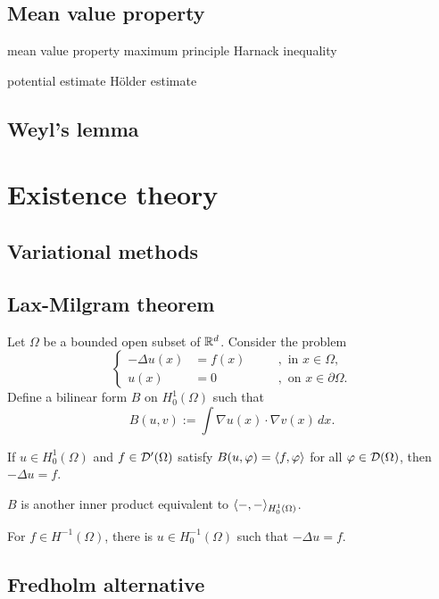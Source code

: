 \documentclass{../../large}
\begin{document}
\section{Mean value property}
mean value property
maximum principle
Harnack inequality

potential estimate
H\"older estimate


\section{Weyl's lemma}



\chapter{Existence theory}

\section{Variational methods}

\section{Lax-Milgram theorem}
\begin{prb}
Let $\Omega$ be a bounded open subset of $\mathbb{R}^d$.
Consider the problem
\[\left\{\begin{alignedat}{2}
-\Delta u(x)&=f(x)&\quad&,\text{ in }x\in\Omega,\\
u(x)&=0&&,\text{ on }x\in\partial\Omega.
\end{alignedat}\right.\]
Define a bilinear form $B$ on $H_0^1(\Omega)$ such that
\[B(u,v):=\int\nabla u(x)\cdot\nabla v(x)\,dx.\]
\begin{parts}
\item If $u\in H_0^1(\Omega)$ and $f\in\mathcal{D}'(\Omega)$ satisfy $B(u,\varphi)=\langle f,\varphi\rangle$ for all $\varphi\in\mathcal{D}(\Omega)$, then $-\Delta u=f$.
\item $B$ is another inner product equivalent to $\langle-,-\rangle_{H_0^1(\Omega)}$.
\item For $f\in H^{-1}(\Omega)$, there is $u\in H_0^{-1}(\Omega)$ such that $-\Delta u=f$.
\end{parts}
\end{prb}

\section{Fredholm alternative}
\end{document}
